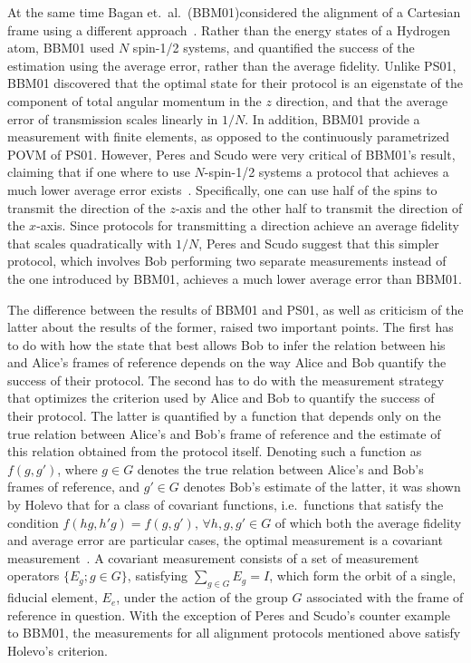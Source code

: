 At the same time Bagan et.~al.~(BBM01)considered the alignment of a Cartesian frame using a different approach~\cite{BBM01}.  Rather than the energy states of a Hydrogen atom, BBM01 used $N$ spin-1/2 systems, and quantified the success of the estimation using the average error, rather than the average fidelity. Unlike PS01, BBM01 discovered that the optimal state for their protocol is an eigenstate of the component of total angular momentum in the $z$ direction, and that the average error of transmission scales linearly in $1/N$. In addition, BBM01 provide a measurement with finite elements, as opposed to the continuously parametrized POVM of PS01. However, Peres and Scudo were very critical of BBM01's result, claiming that if one where to use $N$-spin-1/2 systems a protocol that achieves a much lower average error exists~\cite{PS02a,PS02b}.  Specifically, one can use half of the spins to transmit the direction of the $z$-axis and the other half to transmit the direction of the $x$-axis. Since protocols for transmitting a direction achieve an average fidelity that scales quadratically with $1/N$, Peres and Scudo suggest that this simpler protocol, which involves Bob performing two separate measurements instead of the one introduced by BBM01, achieves a much lower average error than BBM01. 

The difference between the results of BBM01 and PS01, as well as criticism of the latter about the results of the former, raised two important points.  The first has to do with how the state that best allows Bob to infer the relation between his and Alice's frames of reference depends on the way Alice and Bob quantify the success of their protocol.  The second has to do with the measurement strategy that optimizes the criterion used by Alice and Bob to quantify the success of their protocol.  The latter is quantified by a function that depends only on the true relation between Alice's and Bob's frame of reference and the estimate of this relation obtained from the protocol itself. Denoting such a function as $f(g,g')$, where $g\in G$ denotes the true relation between Alice's and Bob's frames of reference, and $g'\in G$ denotes Bob's estimate of the latter, it was shown by Holevo that for a class of covariant functions, i.e.~functions that satisfy the condition $f(hg,h'g)=f(g,g'),\, \forall h,g,g'\in G$ of which both the average fidelity and average error are particular cases, the optimal measurement is a covariant measurement~\cite{H80}. A covariant measurement consists of a set of measurement operators $\{E_g; g\in G\}$, satisfying $\sum_{g\in G}E_g=I$, which form the orbit of a single, fiducial element, $E_e$, under the action of the group $G$ associated with the frame of reference in question.  With the exception of Peres and Scudo's counter example to BBM01, the measurements for all alignment protocols mentioned above satisfy Holevo's criterion.      

